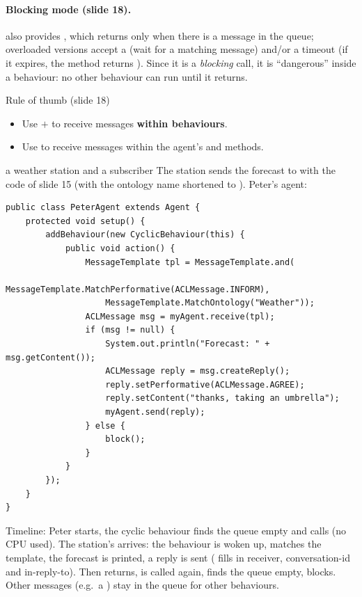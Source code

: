 \paragraph{Blocking mode (slide 18).}  also provides ,
which returns only when there is a message in the queue; overloaded versions accept a
 (wait for a matching message) and/or a timeout (if it expires, the
method returns ). Since it is a \emph{blocking} call, it is ``dangerous'' inside a
behaviour: no other behaviour can run until it returns.

\begin{nbfact}{Rule of thumb (slide 18)}
\begin{itemize}[nosep]
  \item Use  $+$  to receive messages
        \textbf{within behaviours}.
  \item Use  to receive messages within the agent's 
        and  methods.
\end{itemize}
\end{nbfact}

\begin{nbexample}{a weather station and a subscriber}
\notinslides
The station sends the forecast to  with the code of slide 15 (with the ontology name shortened to ). Peter's agent:
\begin{verbatim}
public class PeterAgent extends Agent {
    protected void setup() {
        addBehaviour(new CyclicBehaviour(this) {
            public void action() {
                MessageTemplate tpl = MessageTemplate.and(
                    MessageTemplate.MatchPerformative(ACLMessage.INFORM),
                    MessageTemplate.MatchOntology("Weather"));
                ACLMessage msg = myAgent.receive(tpl);
                if (msg != null) {
                    System.out.println("Forecast: " + msg.getContent());
                    ACLMessage reply = msg.createReply();
                    reply.setPerformative(ACLMessage.AGREE);
                    reply.setContent("thanks, taking an umbrella");
                    myAgent.send(reply);
                } else {
                    block();
                }
            }
        });
    }
}
\end{verbatim}
Timeline: Peter starts, the cyclic behaviour finds the queue empty and calls 
(no CPU used). The station's  arrives: the behaviour is woken up, 
matches the template, the forecast is printed, a reply is sent ( fills in
receiver, conversation-id and in-reply-to). Then  returns, is called again,
finds the queue empty, blocks. Other messages (e.g.\ a ) stay in the queue for
other behaviours.
\end{nbexample}

